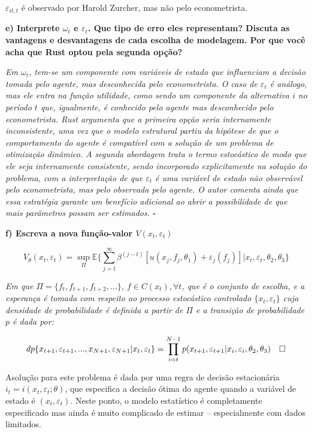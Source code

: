 \documentclass[12pt,a4paper]{article}
\begin{document}
\(\varepsilon_{it,t}\) é observado por Harold Zurcher, mas não pelo
econometrista.

\textbf{e) Interprete \(\omega_t\) e \(\varepsilon_t\). Que tipo de erro
eles representam? Discuta as vantagens e desvantagens de cada escolha de
modelagem. Por que você acha que Rust optou pela segunda opção?}

\emph{Em \(\omega_t\), tem-se um componente com variáveis de estado que
influenciam a decisão tomada pelo agente, mas desconhecida pelo
econometrista. O caso de \(\varepsilon_t\) é análogo, mas ele entra na
função utilidade, como sendo um componente da alternativa \(i\) no
período \(t\) que, igualmente, é conhecido pelo agente mas desconhecido
pelo econometrista. Rust argumenta que a primeira opção seria
internamente inconsistente, uma vez que o modelo estrutural partiu da
hipótese de que o comportamento do agente é compatível com a solução de
um problema de otimização dinâmico. A segunda abordagem trata o termo
estocástico de modo que ele seja internamente consistente, sendo
incorporado explicitamente na solução do problema, com a interpretação
de que \(\varepsilon_t\) é uma variável de estado não observável pelo
econometrista, mas pelo observada pelo agente. O autor comenta ainda que
essa estratégia garante um benefício adicional ao abrir a possibilidade
de que mais parâmetros possam ser estimados. \(\square\)}

\textbf{f) Escreva a nova função-valor \(V(x_t,\varepsilon_t)\)}

\[
V_\theta (x_t,\varepsilon_t) = \sup_\Pi \mathbb{E}\Bigg\{\sum_{j=t}^\infty \beta^{(j-t)}[u(x_j,f_j,\theta_1) + \varepsilon_j(f_j)]|x_t,\varepsilon_t,\theta_2,\theta_3 \Bigg\}
\]

\emph{Em que \(\Pi = \{f_t,f_{t+1},f_{t+2},...\}\),
\(f \in C(x_t), \forall t\), que é o conjunto de escolha, e a esperança
é tomada com respeito ao processo estocástico controlado
\(\{x_t,\varepsilon_t\}\) cuja densidade de probabilidade é definida a
partir de \(\Pi\) e a transição de probabilidade \(p\) é dada por:}

\[
dp\{x_{t+1},\varepsilon_{t+1},...,x_{N+1},\varepsilon_{N+1}|x_t,\varepsilon_t\} \\ = \prod_{i=t}^{N-1}p(x_{t+1},\varepsilon_{t+1}|x_{i},\varepsilon_{i},\theta_2,\theta_3) \quad \square
\]

Asolução para este problema é dada por uma regra de decisão estacionária
\(i_t = i(x_t,\varepsilon_t;\theta)\), que especifica a decisão ótima do
agente quando a variável de estado é \((x_t, \varepsilon_t)\). Neste
ponto, o modelo estatístico é completamente especificado mas ainda é
muito complicado de estimar -- especialmente com dados limitados.
\end{document}
